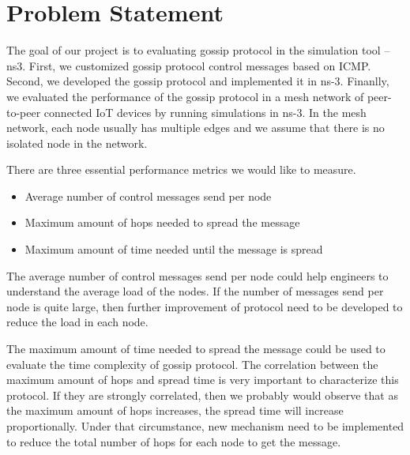 \documentclass[12pt,journal]{IEEEtran}
\begin{document}

\section{Problem Statement}\label{sec:problem}

The goal of our project is to evaluating gossip protocol in the simulation tool -- ns3. First, we customized gossip protocol control messages based on ICMP. Second, we developed the gossip protocol and implemented it in ns-3. Finanlly, we evaluated the performance of the gossip protocol in a mesh network of peer-to-peer connected IoT devices by running simulations in ns-3. In the mesh network, each node usually has multiple edges and we assume that there is no isolated node in the network.

There are three essential performance metrics we would like to measure. 

\begin{itemize}
 \item Average number of control messages send per node
 \item Maximum amount of hops needed to spread the message
 \item Maximum amount of time needed until the message is spread
\end{itemize}

The average number of control messages send per node could help engineers to understand the average load of the nodes. If the number of messages send per node is quite large, then further improvement of protocol need to be developed to reduce the load in each node.

The maximum amount of time needed to spread the message could be used to evaluate the time complexity of gossip protocol. The correlation between the maximum amount of hops and spread time is very important to characterize this protocol. If they are strongly correlated, then we probably would observe that as the maximum amount of hops increases, the spread time will increase proportionally. Under that circumstance, new mechanism need to be implemented to reduce the total number of hops for each node to get the message. 
\end{document}
